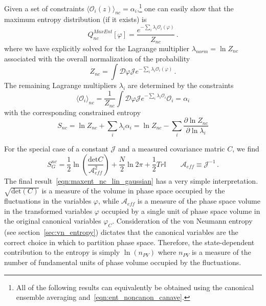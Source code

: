 \documentclass[11pt,a4paper]{article}
\def\det{\mathrm{det}}
\begin{document}
Given a set of constraints $\langle\mathcal{O}_i(z)\rangle_{nc} = \alpha_i$,\footnote{All of the following results can equivalently be obtained using the canonical ensemble averaging and~\eqref{eqn:ent_noncanon_canave}.} one can easily show that the maximum entropy distribution (if it exists) is
\begin{equation}
  Q_{nc}^{MaxEnt}[\varphi] = \frac{e^{-\sum_i\lambda_i\mathcal{O}_i(\varphi)}}{Z_{nc}} \, .
\end{equation}
where we have explicitly solved for the Lagrange multiplier $\lambda_{norm} = \ln Z_{nc}$ associated with the overall normalization of the probability
\begin{equation}
  Z_{nc} = \int\mathcal{D}\varphi\mathcal{J}e^{-\sum_i\lambda_i\mathcal{O}_i(\varphi)} \, .
\end{equation}
The remaining Lagrange multipliers $\lambda_i$ are determined by the constraints
\begin{equation}
  \langle \mathcal{O}_i\rangle_{nc} = \frac{1}{Z_{nc}}\int\mathcal{D}\varphi\mathcal{J}e^{-\sum_i\lambda_i\mathcal{O}_i} \mathcal{O}_i = \alpha_i 
\end{equation}
with the corresponding constrained entropy
\begin{equation}
  S_{nc} = \ln Z_{nc} + \sum_i\lambda_i\alpha_i = \ln Z_{nc} - \sum_i\frac{\partial\ln Z_{nc}}{\partial\ln\lambda_i} %
  \label{eqn:maxent_noncanonical}
\end{equation}

For the special case of a constant $\mathcal{J}$ and a measured covariance matric $C$, we find
\begin{equation}
  S^{nc}_{G} = \frac{1}{2}\ln\left(\frac{\det C}{\mathcal{A}_{eff}^2}\right) + \frac{N}{2}\ln 2\pi + \frac{1}{2}Tr\mathbb{I} \qquad \mathcal{A}_{eff} \equiv \mathcal{J}^{-1} \, .
  \label{eqn:maxent_nc_lin_gaussian}
\end{equation}
The final result~\eqref{eqn:maxent_nc_lin_gaussian} has a very simple interpretation.
$\sqrt{\det(C)}$ is a measure of the volume in phase space occupied by the fluctuations in the variables $\varphi$, while $\mathcal{A}_{eff}$ is a measure of the phase space volume in the transformed variables $\varphi$ occupied by a single unit of phase space volume in the original canonical variables $\varphi_C$.
Consideration of the von Neumann entropy (see section~\ref{sec:vn_entropy}) dictates that the canonical variables are the correct choice in which to partition phase space.
Therefore, the state-dependent contribution to the entropy is simply $\ln(n_{PV})$ where $n_{PV}$ is a measure of the number of fundamental units of phase volume occupied by the fluctuations.
\end{document}
